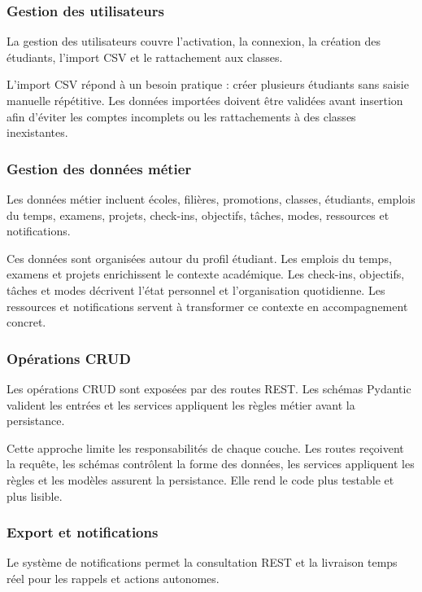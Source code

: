 \documentclass{rapportENSET}
\begin{document}
\subsubsection*{Gestion des utilisateurs}
La gestion des utilisateurs couvre l'activation, la connexion, la création des étudiants, l'import CSV et le rattachement aux classes.

L'import CSV répond à un besoin pratique : créer plusieurs étudiants sans saisie manuelle répétitive. Les données importées doivent être validées avant insertion afin d'éviter les comptes incomplets ou les rattachements à des classes inexistantes.

\subsubsection*{Gestion des données métier}
Les données métier incluent écoles, filières, promotions, classes, étudiants, emplois du temps, examens, projets, check-ins, objectifs, tâches, modes, ressources et notifications.

Ces données sont organisées autour du profil étudiant. Les emplois du temps, examens et projets enrichissent le contexte académique. Les check-ins, objectifs, tâches et modes décrivent l'état personnel et l'organisation quotidienne. Les ressources et notifications servent à transformer ce contexte en accompagnement concret.

\subsubsection*{Opérations CRUD}
Les opérations CRUD sont exposées par des routes REST. Les schémas Pydantic valident les entrées et les services appliquent les règles métier avant la persistance.

Cette approche limite les responsabilités de chaque couche. Les routes reçoivent la requête, les schémas contrôlent la forme des données, les services appliquent les règles et les modèles assurent la persistance. Elle rend le code plus testable et plus lisible.

\subsubsection*{Export et notifications}
Le système de notifications permet la consultation REST et la livraison temps réel pour les rappels et actions autonomes.
\end{document}
